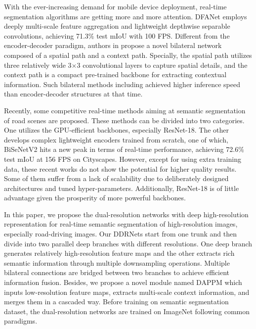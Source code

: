 \documentclass[journal]{IEEEtran}
\begin{document}
With the ever-increasing demand for mobile device deployment, real-time segmentation algorithms\cite{paszke2016enet,9040271,zhao2018icnet,mehta2018espnet,9032321} are getting more and more attention. DFANet\cite{li2019dfanet} employs deeply multi-scale feature aggregation and lightweight depthwise separable convolutions, achieving 71.3$\%$ test mIoU with 100 FPS. Different from the encoder-decoder paradigm,
authors in \cite{yu2018bisenet} propose a novel bilateral network composed of a spatial path and a context path. Specially, the spatial path utilizes three relatively wide 3$\times$3 convolutional layers to capture spatial details, and the context path is a compact pre-trained backbone for extracting contextual information. Such bilateral methods including \cite{poudel2019fast} achieved higher inference speed than encoder-decoder structures at that time.

Recently, some competitive real-time methods aiming at semantic segmentation of road scenes are proposed. These methods can be divided into two categories. One utilizes the GPU-efficient backbones, especially ResNet-18\cite{orsic2019defense,hu2020real,li2020semantic}. The other develops complex lightweight encoders trained from scratch, one of which, BiSeNetV2\cite{yu2020bisenet} hits a new peak in terms of real-time performance, achieving 72.6$\%$ test mIoU at 156 FPS on Cityscapes. However, except for \cite{li2020semantic} using extra training data, these recent works do not show the potential for higher quality results. Some of them suffer from a lack of scalability due to deliberately designed architectures and tuned hyper-parameters. Additionally, ResNet-18 is of little advantage given the prosperity of more powerful backbones.

In this paper, we propose the dual-resolution networks with deep high-resolution representation for real-time semantic segmentation of high-resolution images, especially road-driving images. Our DDRNets start from one trunk and then divide into two parallel deep branches with different resolutions. One deep branch generates relatively high-resolution feature maps and the other extracts rich semantic information through multiple downsampling operations. Multiple bilateral connections are bridged between two branches to achieve efficient information fusion. Besides, we propose a novel module named DAPPM which inputs low-resolution feature maps, extracts multi-scale context information, and merges them in a cascaded way. Before training on semantic segmentation dataset, the dual-resolution networks are trained on ImageNet following common paradigms.
\end{document}
